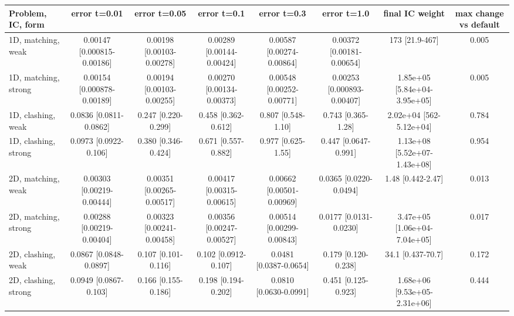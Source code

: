 \begin{tabular}{lccccccc}
\toprule
Problem, IC, form & error t=0.01 & error t=0.05 & error t=0.1 & error t=0.3 & error t=1.0 & final IC weight & max change vs default \\
\midrule
1D, matching, weak & 0.00147 {\scriptsize[0.000815-0.00186]} & 0.00198 {\scriptsize[0.00103-0.00278]} & 0.00289 {\scriptsize[0.00144-0.00424]} & 0.00587 {\scriptsize[0.00274-0.00864]} & 0.00372 {\scriptsize[0.00181-0.00654]} & 173 {\scriptsize[21.9-467]} & 0.005 \\
1D, matching, strong & 0.00154 {\scriptsize[0.000878-0.00189]} & 0.00194 {\scriptsize[0.00103-0.00255]} & 0.00270 {\scriptsize[0.00134-0.00373]} & 0.00548 {\scriptsize[0.00252-0.00771]} & 0.00253 {\scriptsize[0.000893-0.00407]} & 1.85e+05 {\scriptsize[5.84e+04-3.95e+05]} & 0.005 \\
1D, clashing, weak & 0.0836 {\scriptsize[0.0811-0.0862]} & 0.247 {\scriptsize[0.220-0.299]} & 0.458 {\scriptsize[0.362-0.612]} & 0.807 {\scriptsize[0.548-1.10]} & 0.743 {\scriptsize[0.365-1.28]} & 2.02e+04 {\scriptsize[562-5.12e+04]} & 0.784 \\
1D, clashing, strong & 0.0973 {\scriptsize[0.0922-0.106]} & 0.380 {\scriptsize[0.346-0.424]} & 0.671 {\scriptsize[0.557-0.882]} & 0.977 {\scriptsize[0.625-1.55]} & 0.447 {\scriptsize[0.0647-0.991]} & 1.13e+08 {\scriptsize[5.52e+07-1.43e+08]} & 0.954 \\
2D, matching, weak & 0.00303 {\scriptsize[0.00219-0.00444]} & 0.00351 {\scriptsize[0.00265-0.00517]} & 0.00417 {\scriptsize[0.00315-0.00615]} & 0.00662 {\scriptsize[0.00501-0.00969]} & 0.0365 {\scriptsize[0.0220-0.0494]} & 1.48 {\scriptsize[0.442-2.47]} & 0.013 \\
2D, matching, strong & 0.00288 {\scriptsize[0.00219-0.00404]} & 0.00323 {\scriptsize[0.00241-0.00458]} & 0.00356 {\scriptsize[0.00247-0.00527]} & 0.00514 {\scriptsize[0.00299-0.00843]} & 0.0177 {\scriptsize[0.0131-0.0230]} & 3.47e+05 {\scriptsize[1.06e+04-7.04e+05]} & 0.017 \\
2D, clashing, weak & 0.0867 {\scriptsize[0.0848-0.0897]} & 0.107 {\scriptsize[0.101-0.116]} & 0.102 {\scriptsize[0.0912-0.107]} & 0.0481 {\scriptsize[0.0387-0.0654]} & 0.179 {\scriptsize[0.120-0.238]} & 34.1 {\scriptsize[0.437-70.7]} & 0.172 \\
2D, clashing, strong & 0.0949 {\scriptsize[0.0867-0.103]} & 0.166 {\scriptsize[0.155-0.186]} & 0.198 {\scriptsize[0.194-0.202]} & 0.0810 {\scriptsize[0.0630-0.0991]} & 0.451 {\scriptsize[0.125-0.923]} & 1.68e+06 {\scriptsize[9.53e+05-2.31e+06]} & 0.444 \\
\bottomrule
\end{tabular}

